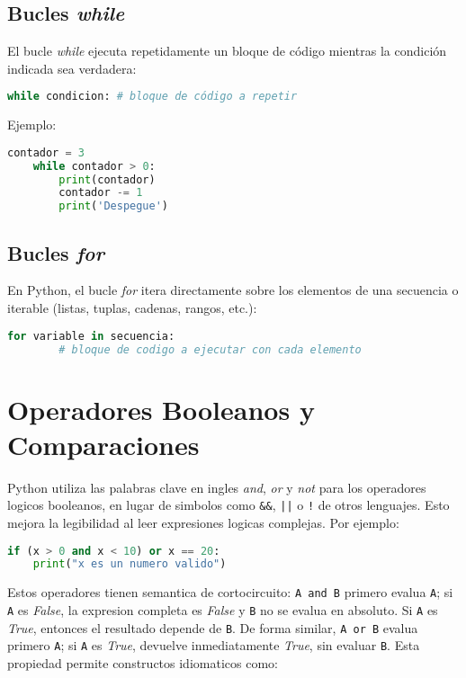 
\subsection*{Bucles \textit{while}} El bucle \textit{while} ejecuta repetidamente un bloque de código mientras la condición indicada sea verdadera: 

\begin{lstlisting}[language=Python, caption={Estructura de bucle while.}] 
    while condicion: # bloque de código a repetir 
\end{lstlisting} 


Ejemplo: 

\begin{lstlisting}[language=Python, caption={Ejemplo de bucle while.}] 
    contador = 3 
    while contador > 0:
        print(contador) 
        contador -= 1 
        print('Despegue') 
\end{lstlisting} 


\subsection*{Bucles \textit{for}} En Python, el bucle \textit{for} itera directamente sobre los elementos de una secuencia o iterable (listas, tuplas, cadenas, rangos, etc.): 
\begin{lstlisting}[language=Python, caption={Estructura de bucle for.}] 
    for variable in secuencia: 
        # bloque de codigo a ejecutar con cada elemento 
\end{lstlisting} 
\section{Operadores Booleanos y Comparaciones}

Python utiliza las palabras clave en ingles \textit{and}, \textit{or} y \textit{not} para los operadores logicos booleanos, en lugar de simbolos como \texttt{\&\&}, \texttt{||} o \texttt{!} de otros lenguajes. Esto mejora la legibilidad al leer expresiones logicas complejas. Por ejemplo:

\begin{lstlisting}[language=Python, caption={Ejemplo de operadores booleanos en Python}]
if (x > 0 and x < 10) or x == 20:
    print("x es un numero valido")
\end{lstlisting}

Estos operadores tienen semantica de cortocircuito: \texttt{A and B} primero evalua \texttt{A}; si \texttt{A} es \textit{False}, la expresion completa es \textit{False} y \texttt{B} no se evalua en absoluto. Si \texttt{A} es \textit{True}, entonces el resultado depende de \texttt{B}. De forma similar, \texttt{A or B} evalua primero \texttt{A}; si \texttt{A} es \textit{True}, devuelve inmediatamente \textit{True}, sin evaluar \texttt{B}. Esta propiedad permite constructos idiomaticos como:

